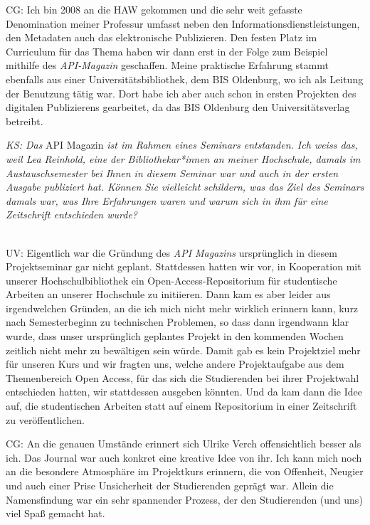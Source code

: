 \documentclass[a4paper,
fontsize=11pt,
oneside,
numbers=noperiodatend,
parskip=half-,
bibliography=totoc,
final
]{scrartcl}
\begin{document}
CG: Ich bin 2008 an die HAW gekommen und die sehr weit gefasste
Denomination meiner Professur umfasst neben den
Informationsdienstleistungen, den Metadaten auch das elektronische
Publizieren. Den festen Platz im Curriculum für das Thema haben wir dann
erst in der Folge zum Beispiel mithilfe des \emph{API-Magazin}
geschaffen. Meine praktische Erfahrung stammt ebenfalls aus einer
Universitätsbibliothek, dem BIS Oldenburg, wo ich als Leitung der
Benutzung tätig war. Dort habe ich aber auch schon in ersten Projekten
des digitalen Publizierens gearbeitet, da das BIS Oldenburg den
Universitätsverlag betreibt.

\emph{KS: Das} API Magazin \emph{ist im Rahmen eines Seminars
entstanden. Ich weiss das, weil Lea Reinhold, eine der
Bibliothekar*innen an meiner Hochschule, damals im Austauschsemester bei
Ihnen in diesem Seminar war und auch in der ersten Ausgabe publiziert
hat. Können Sie vielleicht schildern, was das Ziel des Seminars damals
war, was Ihre Erfahrungen waren und warum sich in ihm für eine
Zeitschrift entschieden wurde?}\\
\strut \\
UV: Eigentlich war die Gründung des \emph{API Magazins} ursprünglich in
diesem Projektseminar gar nicht geplant. Stattdessen hatten wir vor, in
Kooperation mit unserer Hochschulbibliothek ein Open-Access-Repositorium
für studentische Arbeiten an unserer Hochschule zu initiieren. Dann kam
es aber leider aus irgendwelchen Gründen, an die ich mich nicht mehr
wirklich erinnern kann, kurz nach Semesterbeginn zu technischen
Problemen, so dass dann irgendwann klar wurde, dass unser ursprünglich
geplantes Projekt in den kommenden Wochen zeitlich nicht mehr zu
bewältigen sein würde. Damit gab es kein Projektziel mehr für unseren
Kurs und wir fragten uns, welche andere Projektaufgabe aus dem
Themenbereich Open Access, für das sich die Studierenden bei ihrer
Projektwahl entschieden hatten, wir stattdessen ausgeben könnten. Und da
kam dann die Idee auf, die studentischen Arbeiten statt auf einem
Repositorium in einer Zeitschrift zu veröffentlichen.

CG: An die genauen Umstände erinnert sich Ulrike Verch offensichtlich
besser als ich. Das Journal war auch konkret eine kreative Idee von ihr.
Ich kann mich noch an die besondere Atmosphäre im Projektkurs erinnern,
die von Offenheit, Neugier und auch einer Prise Unsicherheit der
Studierenden geprägt war. Allein die Namensfindung war ein sehr
spannender Prozess, der den Studierenden (und uns) viel Spaß gemacht
hat.
\end{document}
